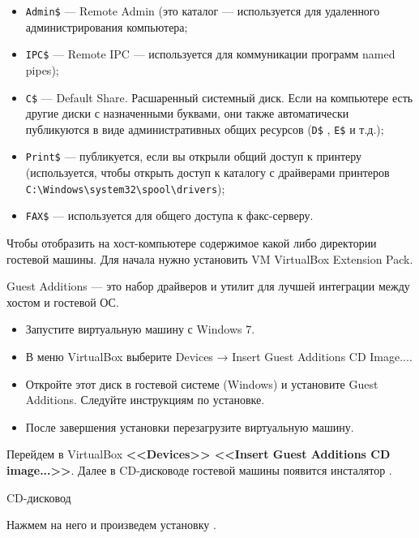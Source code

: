 \begin{itemize}
	\item \verb|Admin$| --- Remote Admin (это каталог %
		--- используется для удаленного администрирования компьютера;
	\item \verb|IPC$|
		--- Remote IPC --- используется для коммуникации программ named pipes);
	\item \verb|C$| --- Default Share. Расшаренный системный диск.
		Если на компьютере есть другие диски с назначенными буквами,
		они также автоматически публикуются
		в виде административных общих ресурсов (\verb|D$| , \verb|E$| и т.д.);
	\item \verb|Print$| --- публикуется, если вы открыли общий доступ
		к принтеру (используется, чтобы открыть доступ к каталогу
		с драйверами принтеров \verb|C:\Windows\system32\spool\drivers|);
	\item \verb|FAX$| --- используется для общего доступа к факс-серверу.
\end{itemize}


Чтобы отобразить на хост-компьютере содержимое какой либо
директории гостевой машины. Для начала нужно установить 
VM VirtualBox Extension Pack.\par
Guest Additions --- это набор драйверов
и утилит для лучшей интеграции между хостом и гостевой ОС.

\begin{itemize}
	\item Запустите виртуальную машину с Windows 7.
	\item В меню VirtualBox выберите
		Devices → Insert Guest Additions CD Image....
	\item Откройте этот диск в гостевой системе (Windows)
		и установите Guest Additions. Следуйте инструкциям по установке.
	\item После завершения установки перезагрузите виртуальную машину.
\end{itemize}

Перейдем в VirtualBox \textbf{<<Devices>>
\rarrow <<Insert Guest Additions CD image...>>}.
Далее в CD-дисководе гостевой машины появится инсталятор
.

\begin{image}
	\caption{CD-дисковод}
	\label{fig:cd:installator}
\end{image}

Нажмем на него и произведем установку
.

